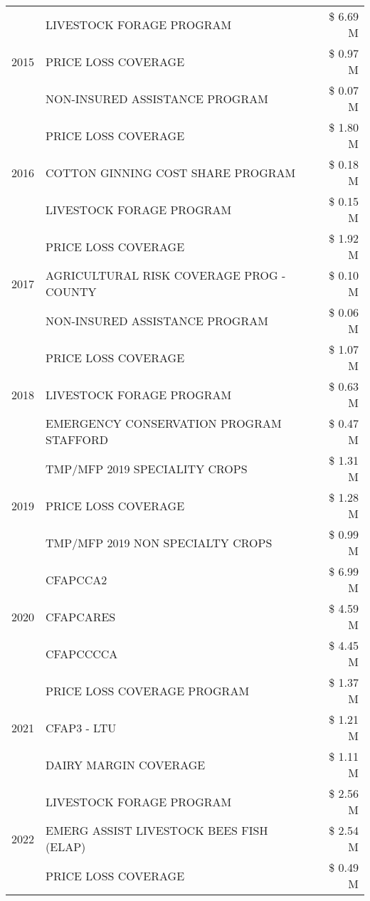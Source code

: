 \begin{tabular}{llr}
\cline{1-3}
\multirow[t]{3}{*}{2015} & LIVESTOCK FORAGE PROGRAM & \$ 6.69 M \\
 & PRICE LOSS COVERAGE & \$ 0.97 M \\
 & NON-INSURED ASSISTANCE PROGRAM & \$ 0.07 M \\
\cline{1-3}
\multirow[t]{3}{*}{2016} & PRICE LOSS COVERAGE & \$ 1.80 M \\
 & COTTON GINNING COST SHARE PROGRAM & \$ 0.18 M \\
 & LIVESTOCK FORAGE PROGRAM & \$ 0.15 M \\
\cline{1-3}
\multirow[t]{3}{*}{2017} & PRICE LOSS COVERAGE & \$ 1.92 M \\
 & AGRICULTURAL RISK COVERAGE PROG - COUNTY & \$ 0.10 M \\
 & NON-INSURED ASSISTANCE PROGRAM & \$ 0.06 M \\
\cline{1-3}
\multirow[t]{3}{*}{2018} & PRICE LOSS COVERAGE & \$ 1.07 M \\
 & LIVESTOCK FORAGE PROGRAM & \$ 0.63 M \\
 & EMERGENCY CONSERVATION PROGRAM STAFFORD & \$ 0.47 M \\
\cline{1-3}
\multirow[t]{3}{*}{2019} & TMP/MFP 2019 SPECIALITY CROPS & \$ 1.31 M \\
 & PRICE LOSS COVERAGE & \$ 1.28 M \\
 & TMP/MFP 2019 NON SPECIALTY CROPS & \$ 0.99 M \\
\cline{1-3}
\multirow[t]{3}{*}{2020} & CFAPCCA2 & \$ 6.99 M \\
 & CFAPCARES & \$ 4.59 M \\
 & CFAPCCCCA & \$ 4.45 M \\
\cline{1-3}
\multirow[t]{3}{*}{2021} & PRICE LOSS COVERAGE PROGRAM & \$ 1.37 M \\
 & CFAP3 - LTU & \$ 1.21 M \\
 & DAIRY MARGIN COVERAGE & \$ 1.11 M \\
\cline{1-3}
\multirow[t]{3}{*}{2022} & LIVESTOCK FORAGE PROGRAM & \$ 2.56 M \\
 & EMERG ASSIST LIVESTOCK BEES FISH (ELAP) & \$ 2.54 M \\
 & PRICE LOSS COVERAGE & \$ 0.49 M \\
\cline{1-3}
\bottomrule
\end{tabular}

